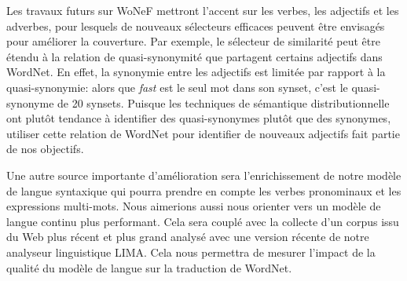 Les travaux futurs sur WoNeF mettront l'accent sur les verbes, les adjectifs et
les adverbes, pour lesquels de nouveaux sélecteurs efficaces peuvent être
envisagés pour améliorer la couverture. Par exemple, le sélecteur de similarité
peut être étendu à la relation de quasi-synonymité que partagent certains
adjectifs dans WordNet. En effet, la synonymie entre les adjectifs est limitée
par rapport à la quasi-synonymie: alors que \textit{fast} est le seul mot dans
son synset, c'est le quasi-synonyme de 20 synsets. Puisque les techniques de
sémantique distributionnelle ont plutôt tendance à identifier des
quasi-synonymes plutôt que des synonymes, utiliser cette relation de WordNet
pour identifier de nouveaux adjectifs fait partie de nos objectifs.

Une autre source importante d'amélioration sera l'enrichissement de notre
modèle de langue syntaxique qui pourra prendre en compte les verbes pronominaux
et les expressions multi-mots. Nous aimerions aussi nous orienter vers un
modèle de langue continu \citep{haison2012continuous} plus performant. Cela
sera couplé avec la collecte d'un corpus issu du Web plus récent et plus grand
analysé avec une version récente de notre analyseur linguistique LIMA. Cela
nous permettra de mesurer l'impact de la qualité du modèle de langue sur la
traduction de WordNet.

